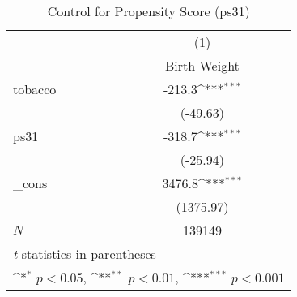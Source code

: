 \begin{table}[htbp]\centering
\def\sym#1{\ifmmode^{#1}\else\(^{#1}\)\fi}
\caption{Control for Propensity Score (ps31)\label{e1}}
\begin{tabular}{l*{1}{c}}
\hline\hline
            &\multicolumn{1}{c}{(1)}\\
            &\multicolumn{1}{c}{Birth Weight}\\
\hline
tobacco     &      -213.3\sym{***}\\
            &    (-49.63)         \\
[1em]
ps31        &      -318.7\sym{***}\\
            &    (-25.94)         \\
[1em]
\_cons      &      3476.8\sym{***}\\
            &   (1375.97)         \\
\hline
\(N\)       &      139149         \\
\hline\hline
\multicolumn{2}{l}{\footnotesize \textit{t} statistics in parentheses}\\
\multicolumn{2}{l}{\footnotesize \sym{*} \(p<0.05\), \sym{**} \(p<0.01\), \sym{***} \(p<0.001\)}\\
\end{tabular}
\end{table}

